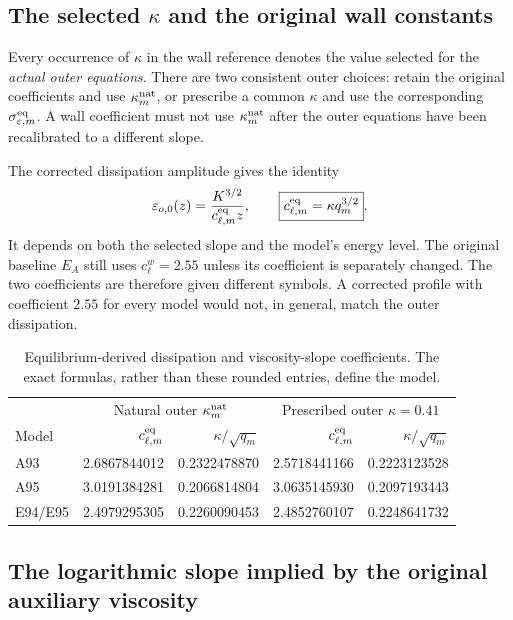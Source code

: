 \documentclass[11pt,a4paper]{article}
\numberwithin{equation}{section}
\newcommand{\eps}{\varepsilon}
\begin{document}
\subsection{The selected \texorpdfstring{$\kappa$}{kappa} and the original wall constants}
\label{kap:selection}

Every occurrence of $\kappa$ in the wall reference denotes the value
selected for the \emph{actual outer equations}. There are two consistent
outer choices: retain the original coefficients and use
$\kappa_m^{\rm nat}$, or prescribe a common $\kappa$ and use the
corresponding $\sigma_{\eps,m}^{\rm eq}$. A wall coefficient must not
use $\kappa_m^{\rm nat}$ after the outer equations have been recalibrated
to a different slope.

The corrected dissipation amplitude gives the identity
\begin{equation}
 \eps_{o,0}(z)=\frac{K^{3/2}}{c_{\ell,m}^{\rm eq}z},
 \qquad
 \boxed{c_{\ell,m}^{\rm eq}=\kappa q_m^{3/2}}.
 \label{kap:ell-equilibrium}
\end{equation}
It depends on both the selected slope and the model's energy level.
The original baseline $E_A$ still uses $c_\ell^w=2.55$ unless its
coefficient is separately changed. The two coefficients are therefore
given different symbols. A corrected profile with coefficient $2.55$
for every model would not, in general, match the outer dissipation.

\begin{table}[htbp]
\centering\small
\caption{Equilibrium-derived dissipation and viscosity-slope coefficients.
The exact formulas, rather than these rounded entries, define the model.}
\label{kap:table}
\begin{tabular}{@{}lrrrr@{}}
\toprule
 & \multicolumn{2}{c}{Natural outer $\kappa_m^{\rm nat}$}
 & \multicolumn{2}{c}{Prescribed outer $\kappa=0.41$}\\
Model & $c_{\ell,m}^{\rm eq}$ & $\kappa/\sqrt{q_m}$
      & $c_{\ell,m}^{\rm eq}$ & $\kappa/\sqrt{q_m}$\\
\midrule
A93 &2.6867844012&0.2322478870&2.5718441166&0.2223123528\\
A95 &3.0191384281&0.2066814804&3.0635145930&0.2097193443\\
E94/E95&2.4979295305&0.2260090453&2.4852760107&0.2248641732\\
\bottomrule
\end{tabular}
\end{table}

\subsection{The logarithmic slope implied by the original auxiliary viscosity}
\label{kap:implicit}
\end{document}

